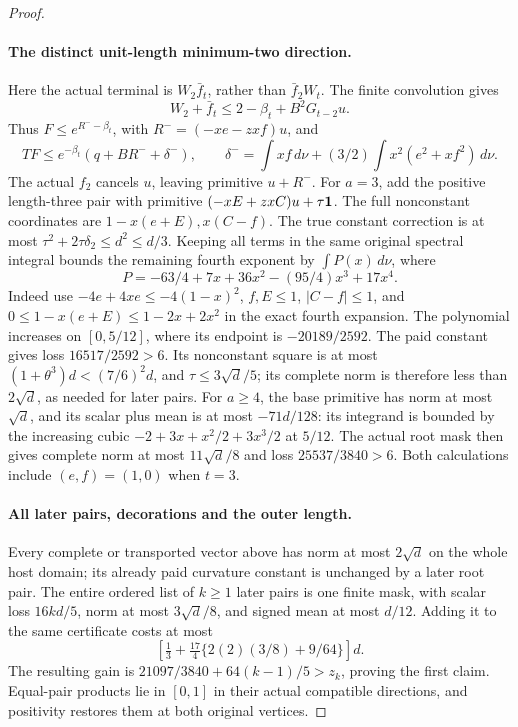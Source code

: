 \begin{proof}
\paragraph{The distinct unit-length minimum-two direction.}
\label{part:odd-two:unit}
Here the actual terminal is \(W_2\bar f_t\), rather than
\(\bar f_2W_t\). The finite convolution gives
\[
 W_2+\bar f_t\le2-\beta_t+B^2G_{t-2}u.
\]
Thus \(F\le e^{R^--\beta_t}\), with
\(R^-=(-xe-zxf)u\), and
\[
 TF\le e^{-\beta_t}(q+BR^-+\delta^-),\qquad
 \delta^-=\int xf\,d\nu+(3/2)\int x^2(e^2+xf^2)\,d\nu.
\]
The actual \(f_2\) cancels \(u\), leaving primitive \(u+R^-\).
For \(a=3\), add the positive length-three pair with primitive
\((-xE+zxC)u+\tau\mathbf1\). The full nonconstant coordinates are
\(1-x(e+E),x(C-f)\). The true constant correction is at most
\(\tau^2+2\tau\delta_2\le d^2\le d/3\).
Keeping all terms in the same original spectral integral bounds the
remaining fourth exponent by \(\int P(x)\,d\nu\), where
\[
 P=-63/4+7x+36x^2-(95/4)x^3+17x^4.
\]
Indeed use \(-4e+4xe\le-4(1-x)^2\), \(f,E\le1\),
\(|C-f|\le1\), and
\(0\le1-x(e+E)\le1-2x+2x^2\) in the exact fourth expansion.
The polynomial increases on \([0,5/12]\), where its endpoint is
\(-20189/2592\). The paid constant gives loss
\(16517/2592>6\).
Its nonconstant square is at most \((1+\theta^3)d<(7/6)^2d\),
and \(\tau\le3\sqrt d/5\); its complete norm is therefore
less than \(2\sqrt d\), as needed for later pairs.
For \(a\ge4\), the base primitive has norm at most \(\sqrt d\),
and its scalar plus mean is at most \(-71d/128\): its integrand
is bounded by the increasing cubic
\(-2+3x+x^2/2+3x^3/2\) at \(5/12\).
The actual root mask then gives complete norm at most
\(11\sqrt d/8\) and loss \(25537/3840>6\).
Both calculations include \((e,f)=(1,0)\) when \(t=3\).

\paragraph{All later pairs, decorations and the outer length.}
\label{part:odd-two:outer}
Every complete or transported vector above has norm at most
\(2\sqrt d\) on the whole host domain; its already paid curvature
constant is unchanged by a later root pair. The entire ordered list
of \(k\ge1\) later pairs is one finite mask, with scalar loss
\(16kd/5\), norm at most \(3\sqrt d/8\), and signed mean at most
\(d/12\). Adding it to the same certificate costs at most
\[
 \left[\tfrac13+\tfrac{17}{4}
       \{2(2)(3/8)+9/64\}\right]d.
\]
The resulting gain is
\(21097/3840+64(k-1)/5>z_k\), proving the first claim.
Equal-pair products lie in \([0,1]\) in their actual compatible
directions, and positivity restores them at both original vertices.


\end{proof}
